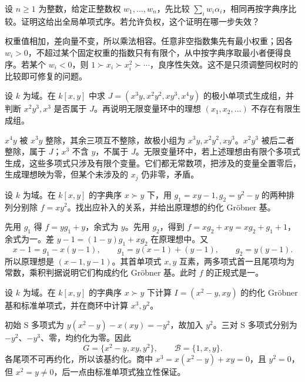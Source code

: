 \begin{exercise}\label{b3:ex:08-weighted-order}
	设 \(n\ge1\) 为整数，给定正整数权 \(w_1,\ldots,w_n\)，先比较 \(\sum_iw_i\alpha_i\)，相同再按字典序比较。证明这给出全局单项式序。若允许负权，这个证明在哪一步失效？
\end{exercise}
\begin{solution}
	权重值相加，差向量不变，所以乘法相容。任意非空指数集先有最小权重；因各 \(w_i>0\)，不超过某个固定权重的指数只有有限个，从中按字典序取最小者便得良序。若某个 \(w_i<0\)，则 \(1\succ x_i\succ x_i^2\succ\cdots\)，良序性失效。这不是只须调整同权时的比较即可修复的问题。
\end{solution}

\begin{exercise}\label{b3:ex:08-monomial-minimal}
	设 \(k\) 为域。在 \(k[x,y]\) 中求 \(J=(x^3y,x^2y^2,xy^3,x^4y)\) 的极小单项式生成组，并判断 \(x^2y^3,x^3\) 是否属于 \(J\)。再说明无限变量环中的理想 \((x_1,x_2,\ldots)\) 不存在有限生成组。
\end{exercise}
\begin{solution}
	\(x^4y\) 被 \(x^3y\) 整除，其余三项互不整除，故极小组为 \(x^3y,x^2y^2,xy^3\)。\(x^2y^3\) 被后二者整除，属于 \(J\)；\(x^3\) 不含 \(y\)，不属于 \(J\)。无限变量环中，若上述理想由有限个多项式生成，这些多项式只涉及有限个变量。它们都无常数项，把涉及的变量全置零后，生成理想映为零，但某个未涉及的 \(x_j\) 仍非零，矛盾。
\end{solution}

\begin{exercise}\label{b3:ex:08-division-choice}
	设 \(k\) 为域。在 \(k[x,y]\) 的字典序 \(x\succ y\) 下，用 \(g_1=xy-1,g_2=y^2-y\) 的两种排列分别除 \(f=xy^2\)。找出应补入的关系，并给出原理想的约化 Gröbner 基。
\end{exercise}
\begin{solution}
	先用 \(g_1\) 得 \(f=yg_1+y\)，余式为 \(y\)。先用 \(g_2\)，得到 \(f=xg_2+xy=xg_2+g_1+1\)，余式为一。差 \(y-1=(1-y)g_1+xg_2\) 在原理想中。又
	\[
		x-1=g_1-x(y-1),\qquad g_1=y(x-1)+(y-1),\qquad g_2=y(y-1).
	\]
	所以原理想是 \((x-1,y-1)\)。其首单项式 \(x,y\) 互素，两多项式首一且尾项均为常数，乘积判据说明它们构成约化 Gröbner 基。此时 \(f\) 的正规式是一。
\end{solution}

\begin{exercise}\label{b3:ex:08-nonreduced-buchberger}
	设 \(k\) 为域。在 \(k[x,y]\) 的字典序 \(x\succ y\) 下计算 \(I=(x^2-y,xy)\) 的约化 Gröbner 基和标准单项式，并在商环中计算 \(x^3,y^2\)。
\end{exercise}
\begin{solution}
	初始 S 多项式为 \(y(x^2-y)-x(xy)=-y^2\)，故加入 \(y^2\)。三对 S 多项式分别为 \(-y^2\)、\(-y^3\)、零，均约化为零。因此
	\[
		G=\{x^2-y,xy,y^2\},\qquad \mathcal B=\{1,x,y\}.
	\]
	各尾项不可再约化，所以该基约化。商中 \(x^3=x(x^2-y)+xy=0\)，且 \(y^2=0\)，但 \(x^2=y\ne0\)，后一点由标准单项式独立性保证。
\end{solution}

